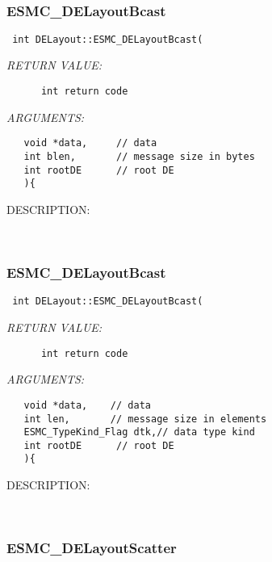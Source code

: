 \mbox{}\hrulefill\
 
\subsubsection [ESMC\_DELayoutBcast] {ESMC\_DELayoutBcast}


  
\begin{verbatim} int DELayout::ESMC_DELayoutBcast(\end{verbatim}{\em RETURN VALUE:}
\begin{verbatim}      int return code\end{verbatim}{\em ARGUMENTS:}
\begin{verbatim}   void *data,     // data
   int blen,       // message size in bytes
   int rootDE      // root DE
   ){\end{verbatim}
{\sf DESCRIPTION:\\ }


   
 
\mbox{}\hrulefill\
 
\subsubsection [ESMC\_DELayoutBcast] {ESMC\_DELayoutBcast}


  
\begin{verbatim} int DELayout::ESMC_DELayoutBcast(\end{verbatim}{\em RETURN VALUE:}
\begin{verbatim}      int return code\end{verbatim}{\em ARGUMENTS:}
\begin{verbatim}   void *data,    // data
   int len,       // message size in elements
   ESMC_TypeKind_Flag dtk,// data type kind
   int rootDE      // root DE
   ){\end{verbatim}
{\sf DESCRIPTION:\\ }


   
 
\mbox{}\hrulefill\
 
\subsubsection [ESMC\_DELayoutScatter] {ESMC\_DELayoutScatter}


